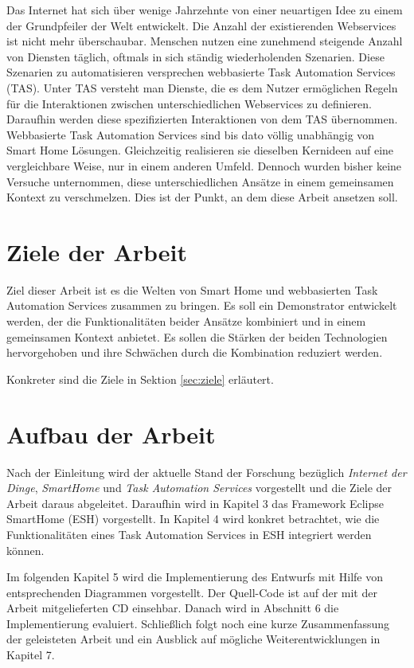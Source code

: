 Das Internet hat sich über wenige Jahrzehnte von einer neuartigen Idee zu einem der Grundpfeiler der Welt entwickelt. Die Anzahl der existierenden Webservices ist nicht mehr überschaubar. 
Menschen nutzen eine zunehmend steigende Anzahl von Diensten täglich, oftmals in sich ständig wiederholenden Szenarien. 
Diese Szenarien zu automatisieren versprechen webbasierte Task Automation Services (TAS). Unter TAS versteht man Dienste, die es dem Nutzer ermöglichen Regeln für die Interaktionen zwischen unterschiedlichen Webservices zu definieren. Daraufhin werden diese spezifizierten Interaktionen von dem TAS übernommen.\\

Webbasierte Task Automation Services sind bis dato völlig unabhängig von Smart Home Lösungen. Gleichzeitig realisieren sie dieselben Kernideen auf eine vergleichbare Weise, nur in einem anderen Umfeld. Dennoch wurden bisher keine Versuche unternommen, diese unterschiedlichen Ansätze in einem gemeinsamen Kontext zu verschmelzen. Dies ist der Punkt, an dem diese Arbeit ansetzen soll.


\section{Ziele der Arbeit}
Ziel dieser Arbeit ist es die Welten von Smart Home und webbasierten Task Automation Services zusammen zu bringen. Es soll ein Demonstrator entwickelt werden, der die  Funktionalitäten beider Ansätze kombiniert und in einem gemeinsamen Kontext anbietet. Es sollen die Stärken der beiden Technologien hervorgehoben und ihre Schwächen durch die Kombination reduziert werden.

Konkreter sind die Ziele in Sektion \ref{sec:ziele} erläutert.


\section{Aufbau der Arbeit}
Nach der Einleitung wird der aktuelle Stand der Forschung bezüglich \textit{Internet der Dinge}, \textit{SmartHome} und \textit{Task Automation Services} vorgestellt und die Ziele der Arbeit daraus abgeleitet. Daraufhin wird in Kapitel 3 das Framework Eclipse SmartHome (ESH) vorgestellt. In Kapitel 4 wird konkret betrachtet, wie die Funktionalitäten eines Task Automation Services in ESH integriert werden können.

Im folgenden Kapitel 5 wird die Implementierung des Entwurfs mit Hilfe von entsprechenden
Diagrammen vorgestellt. Der Quell-Code ist auf der mit der Arbeit mitgelieferten
CD einsehbar. Danach wird in Abschnitt 6 die Implementierung evaluiert. Schließlich folgt
noch eine kurze Zusammenfassung der geleisteten Arbeit und ein Ausblick auf mögliche
Weiterentwicklungen in Kapitel 7.

